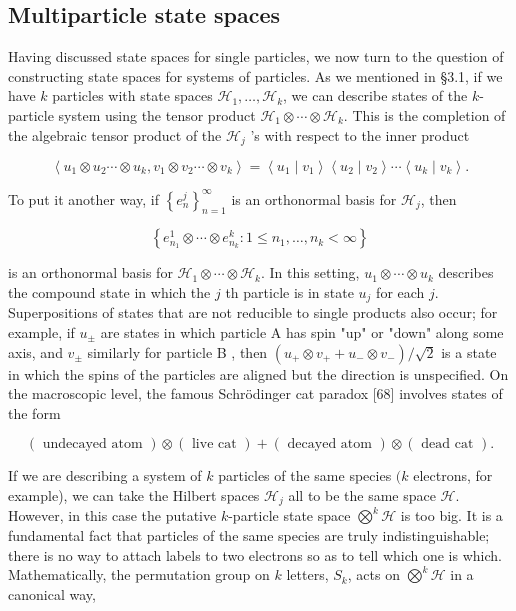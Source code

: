 \documentclass[10pt, letterpaper]{article}
\begin{document}
\subsection*{Multiparticle state spaces}
Having discussed state spaces for single particles, we now turn to the question of constructing state spaces for systems of particles. As we mentioned in §3.1, if we have $k$ particles with state spaces $\mathcal{H}_{1}, \ldots, \mathcal{H}_{k}$, we can describe states of the $k$-particle system using the tensor product $\mathcal{H}_{1} \otimes \cdots \otimes \mathcal{H}_{k}$. This is the completion of the algebraic tensor product of the $\mathcal{H}_{j}$ 's with respect to the inner product

$$
\left\langle u_{1} \otimes u_{2} \cdots \otimes u_{k}, v_{1} \otimes v_{2} \cdots \otimes v_{k}\right\rangle=\left\langle u_{1} \mid v_{1}\right\rangle\left\langle u_{2} \mid v_{2}\right\rangle \cdots\left\langle u_{k} \mid v_{k}\right\rangle .
$$

To put it another way, if $\left\{e_{n}^{j}\right\}_{n=1}^{\infty}$ is an orthonormal basis for $\mathscr{H}_{j}$, then

$$
\left\{e_{n_{1}}^{1} \otimes \cdots \otimes e_{n_{k}}^{k}: 1 \leq n_{1}, \ldots, n_{k}<\infty\right\}
$$

is an orthonormal basis for $\mathcal{H}_{1} \otimes \cdots \otimes \mathcal{H}_{k}$. In this setting, $u_{1} \otimes \cdots \otimes u_{k}$ describes the compound state in which the $j$ th particle is in state $u_{j}$ for each $j$. Superpositions of states that are not reducible to single products also occur; for example, if $u_{ \pm}$ are states in which particle A has spin "up" or "down" along some axis, and $v_{ \pm}$ similarly for particle B , then $\left(u_{+} \otimes v_{+}+u_{-} \otimes v_{-}\right) / \sqrt{2}$ is a state in which the spins of the particles are aligned but the direction is unspecified. On the macroscopic level, the famous Schrödinger cat paradox [68] involves states of the form

$$
(\text { undecayed atom }) \otimes(\text { live cat })+(\text { decayed atom }) \otimes(\text { dead cat }) .
$$

If we are describing a system of $k$ particles of the same species $(k$ electrons, for example), we can take the Hilbert spaces $\mathcal{H}_{j}$ all to be the same space $\mathcal{H}$. However, in this case the putative $k$-particle state space $\bigotimes^{k} \mathcal{H}$ is too big. It is a fundamental fact that particles of the same species are truly indistinguishable; there is no way to attach labels to two electrons so as to tell which one is which. Mathematically, the permutation group on $k$ letters, $S_{k}$, acts on $\bigotimes^{k} \mathcal{H}$ in a canonical way,
\end{document}
